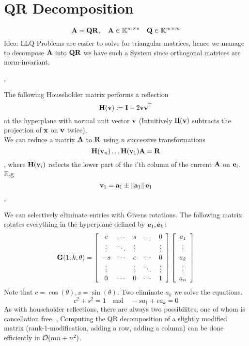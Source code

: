 \section{QR Decomposition}
$$\mathbf{A} = \mathbf{Q}\mathbf{R} , \quad \mathbf{A}\in\mathbb{K}^{m\times n} \quad \mathbf{Q}\in\mathbb{K}^{m\times m}$$
Idea: LLQ Problems are easier to solve for triangular matrices, hence we manage to decompose $\mathbf{A}$ into $\mathbf{Q}\mathbf{R}$ we have such a System since orthogonal matrices are norm-invariant.

\sep

 The following Householder matrix performs a reflection 
$$
\mathbf{H}(\mathbf{v}):=\mathbf{I}-2 \mathbf{v v}^{\top}
$$
at the hyperplane with normal unit vector $\mathbf{v}$ (Intuitively $\mathrm{H}(\mathbf{v})$ subtracts the projection of $\mathbf{x}$ on $\mathbf{v}$ twice). \\
We can reduce a matrix $\mathbf{A}$ to $\mathbf{R}$ using $n$ successive transformations
$$ \mathbf{H}(\mathbf{v}_n) \dots \mathbf{H}(\mathbf{v}_1) \mathbf{A} = \mathbf{R}$$
 , where $\mathbf{H}(\mathbf{v}_i)$ reflects the lower part of the i'th column of the current $\mathbf{A}$ on $\mathbf{e}_i$. E.g
 $$ \mathbf{v}_1 = \mathbf{a}_1 \pm \left\lVert \mathbf{a}_1 \right\rVert \mathbf{e}_1$$
 \sep
 
  We can selectively eliminate entries with Givens rotations.  The following matrix rotates everything in the hyperplane defined by $\mathbf{e}_1, \mathbf{e}_k$:
 $$ \mathbf{G}(1, k, \theta) = 
\left[\begin{array}{ccccc}
c & \cdots & s & \cdots & 0 \\
\vdots & \ddots & \vdots & & \vdots \\
-s & \cdots & c & \cdots & 0 \\
\vdots & & \vdots & \ddots & \vdots \\
0 & \cdots & 0 & \cdots & 1
\end{array}\right]\left[\begin{array}{c}
a_{1} \\
\vdots \\
a_{k} \\
\vdots \\
a_{n}
\end{array}\right]
$$
Note that $c=\cos(\theta), s=\sin(\theta)$. Two eliminate $a_k$ we solve the equations.
$$ c^2 + s^2 = 1 \quad \text{and} \quad
   -s a_1 + c a_k = 0$$
 As with householder reflections, there are always two possibilites, one of whom is cancellation free.
 \sep
 Computing the QR decomposition of a slightly modified matrix (rank-1-modification, adding a row, adding a column) can be done efficiently in $\mathcal{O}(mn + n^2)$.
 
